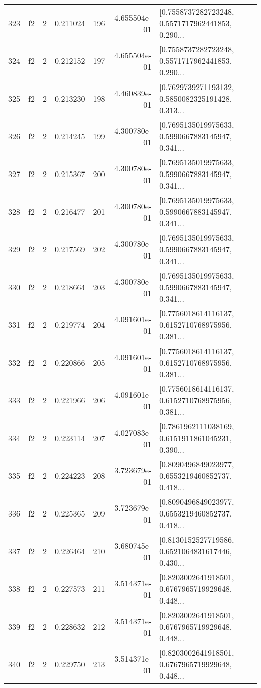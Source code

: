 \begin{tabular}{lllrlrl}
323 &  f2 &   2 &  0.211024 &  196 &  4.655504e-01 &  [0.7558737282723248, 0.5571717962441853, 0.290... \\
324 &  f2 &   2 &  0.212152 &  197 &  4.655504e-01 &  [0.7558737282723248, 0.5571717962441853, 0.290... \\
325 &  f2 &   2 &  0.213230 &  198 &  4.460839e-01 &  [0.7629739271193132, 0.5850082325191428, 0.313... \\
326 &  f2 &   2 &  0.214245 &  199 &  4.300780e-01 &  [0.7695135019975633, 0.5990667883145947, 0.341... \\
327 &  f2 &   2 &  0.215367 &  200 &  4.300780e-01 &  [0.7695135019975633, 0.5990667883145947, 0.341... \\
328 &  f2 &   2 &  0.216477 &  201 &  4.300780e-01 &  [0.7695135019975633, 0.5990667883145947, 0.341... \\
329 &  f2 &   2 &  0.217569 &  202 &  4.300780e-01 &  [0.7695135019975633, 0.5990667883145947, 0.341... \\
330 &  f2 &   2 &  0.218664 &  203 &  4.300780e-01 &  [0.7695135019975633, 0.5990667883145947, 0.341... \\
331 &  f2 &   2 &  0.219774 &  204 &  4.091601e-01 &  [0.7756018614116137, 0.6152710768975956, 0.381... \\
332 &  f2 &   2 &  0.220866 &  205 &  4.091601e-01 &  [0.7756018614116137, 0.6152710768975956, 0.381... \\
333 &  f2 &   2 &  0.221966 &  206 &  4.091601e-01 &  [0.7756018614116137, 0.6152710768975956, 0.381... \\
334 &  f2 &   2 &  0.223114 &  207 &  4.027083e-01 &  [0.7861962111038169, 0.6151911861045231, 0.390... \\
335 &  f2 &   2 &  0.224223 &  208 &  3.723679e-01 &  [0.8090496849023977, 0.6553219460852737, 0.418... \\
336 &  f2 &   2 &  0.225365 &  209 &  3.723679e-01 &  [0.8090496849023977, 0.6553219460852737, 0.418... \\
337 &  f2 &   2 &  0.226464 &  210 &  3.680745e-01 &  [0.8130152527719586, 0.6521064831617446, 0.430... \\
338 &  f2 &   2 &  0.227573 &  211 &  3.514371e-01 &  [0.8203002641918501, 0.6767965719929648, 0.448... \\
339 &  f2 &   2 &  0.228632 &  212 &  3.514371e-01 &  [0.8203002641918501, 0.6767965719929648, 0.448... \\
340 &  f2 &   2 &  0.229750 &  213 &  3.514371e-01 &  [0.8203002641918501, 0.6767965719929648, 0.448... \\

\end{tabular}
